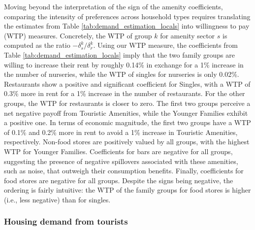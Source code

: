 \documentclass[11pt]{article}
\begin{document}
Moving beyond the interpretation of the sign of the amenity coefficients, comparing the intensity of preferences across household types requires translating the estimates from Table \ref{tab:demand_estimation_locals} into willingness to pay (WTP) measures. Concretely, the WTP of group $k$ for amenity sector $s$ is computed as the ratio $-\delta^k_s/\delta^k_r$. Using our WTP measure, the coefficients from Table \ref{tab:demand_estimation_locals} imply that the two family groups are willing to increase their rent by roughly 0.14\% in exchange for a 1\% increase in the number of nurseries, while the WTP of singles for nurseries is only 0.02\%. Restaurants show a positive and significant coefficient for Singles, with a WTP of 0.3\% more in rent for a 1\% increase in the number of restaurants. For the other groups, the WTP for restaurants is closer to zero. The first two groups perceive a net negative payoff from Touristic Amenities, while the Younger Families exhibit a positive one. In terms of economic magnitude, the first two groups have a WTP of 0.1\% and 0.2\% more in rent to avoid a 1\% increase in Touristic Amenities, respectively. Non-food stores are positively valued by all groups, with the highest WTP for Younger Families. Coefficients for bars are negative for all groups, suggesting the presence of negative spillovers associated with these amenities, such as noise, that outweigh their consumption benefits. Finally, coefficients for food stores are negative for all groups. Despite the signs being negative, the ordering is fairly intuitive: the WTP of the family groups for food stores is higher (i.e., less negative) than for singles.

\subsubsection{Housing demand from tourists}\label{sec:estimation_tourists}
\end{document}
